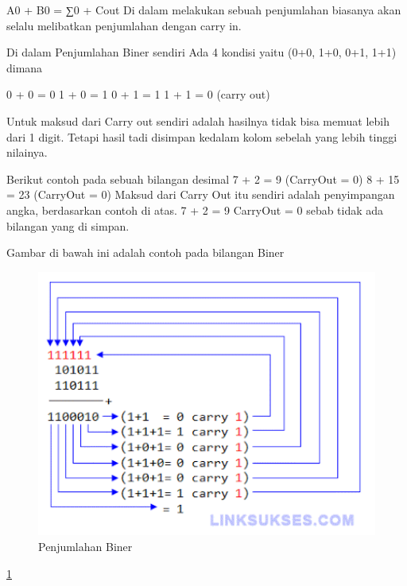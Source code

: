 A0 + B0 = ∑0 + Cout
Di dalam melakukan sebuah penjumlahan biasanya akan selalu melibatkan penjumlahan dengan carry in.

Di dalam Penjumlahan Biner sendiri Ada 4 kondisi yaitu
(0+0, 1+0, 0+1, 1+1) dimana

0 + 0 = 0
1 + 0 = 1
0 + 1 = 1
1 + 1 = 0 (carry out) 

Untuk maksud dari Carry out sendiri adalah hasilnya tidak bisa memuat lebih dari 1 digit. Tetapi  hasil tadi disimpan kedalam kolom sebelah yang lebih tinggi nilainya.

Berikut contoh pada sebuah bilangan desimal
7 + 2 = 9 (CarryOut = 0)
8 + 15 = 23 (CarryOut = 0)
Maksud dari Carry Out itu sendiri adalah penyimpangan angka, berdasarkan contoh di atas. 7 + 2 = 9 CarryOut = 0 sebab tidak ada bilangan yang di simpan. 

Gambar di bawah ini adalah contoh pada bilangan Biner
	\begin{figure} [ht]
	\centerline{\includegraphics[width=1\textwidth]{figures/Penjumlahan-Biner.gif}}
	\caption{Penjumlahan Biner}
	\label{Penjumlahan-Biner}
	\end{figure}
\ref{Penjumlahan-Biner}

